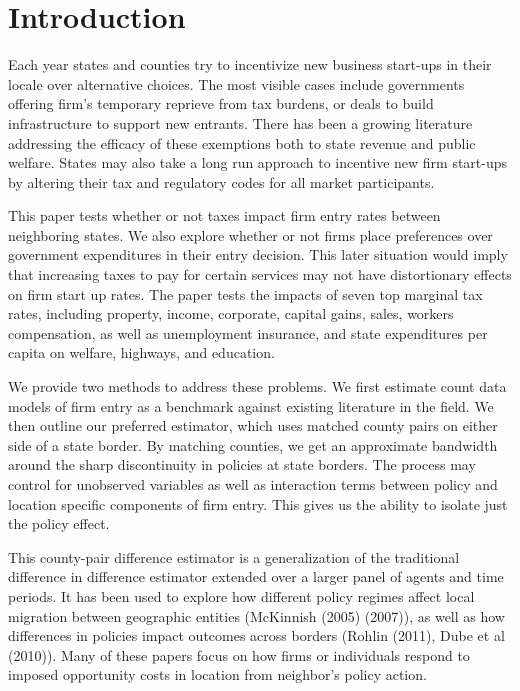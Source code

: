 
\section{Introduction}

Each year states and counties try to incentivize new business start-ups in their locale over alternative choices. The most visible cases include governments offering firm's temporary reprieve from tax burdens, or deals to build infrastructure to support new entrants. There has been a growing literature addressing the efficacy of these exemptions both to state revenue and public welfare. States may also take a long run approach to incentive new firm start-ups by altering their tax and regulatory codes for all market participants. 

This paper tests whether or not taxes impact firm entry rates between neighboring states. We also explore whether or not firms place preferences over government expenditures in their entry decision. This later situation would imply that increasing taxes to pay for certain services may not have distortionary effects on firm start up rates. The paper tests the impacts of seven top marginal tax rates, including property, income, corporate, capital gains, sales, workers compensation, as well as unemployment insurance, and state expenditures per capita on welfare, highways, and education.

We provide two methods to address these problems. We first estimate count data models of firm entry as a benchmark against existing literature in the field. We then outline our preferred estimator, which uses matched county pairs on either side of a state border. By matching counties, we get an approximate bandwidth around the sharp discontinuity in policies at state borders. The process may control for unobserved variables as well as interaction terms between policy and location specific components of firm entry. This gives us the ability to isolate just the policy effect.

This county-pair difference estimator is a generalization of the traditional difference in difference estimator extended over a larger panel of agents and time periods. It has been used to explore how different policy regimes affect local migration between geographic entities (McKinnish (2005) (2007)), as well as how differences in policies impact outcomes across borders (Rohlin (2011), Dube et al (2010)). Many of these papers focus on how firms or individuals respond to imposed opportunity costs in location from neighbor's policy action.

